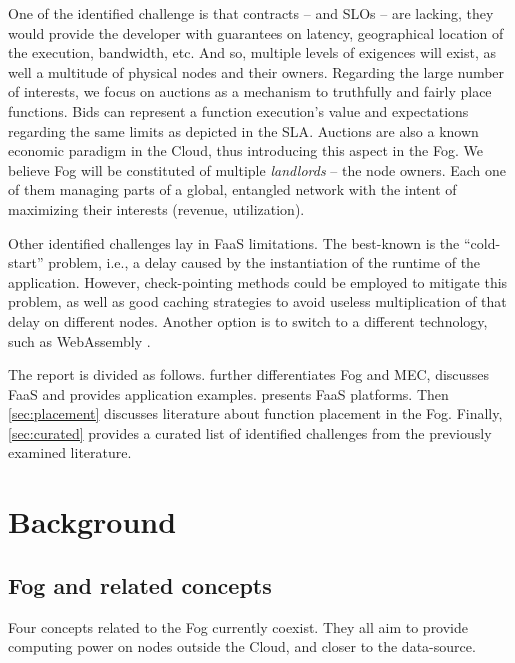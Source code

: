 One of the identified challenge is that contracts --  and \glspl{SLO} -- are lacking, they would provide the developer with guarantees on latency, geographical location of the execution, bandwidth, etc. And so, multiple levels of exigences will exist, as well a multitude of physical nodes and their owners. Regarding the large number of interests, we focus on auctions as a mechanism to truthfully and fairly place functions. Bids can represent a function execution's value and expectations regarding the same limits as depicted in the \gls{SLA}. Auctions are also a known economic paradigm in the Cloud, thus introducing this aspect in the Fog. We believe Fog will be constituted of multiple \emph{landlords} -- the node owners. Each one of them managing parts of a global, entangled network with the intent of maximizing their interests (revenue, utilization).

Other identified challenges lay in \gls{FaaS} limitations. The best-known is the ``cold-start'' problem, i.e., a delay caused by the instantiation of the runtime of the application. However, check-pointing methods could be employed to mitigate this problem, as well as good caching strategies to avoid useless multiplication of that delay on different nodes. Another option is to switch to a different technology, such as WebAssembly \cite{hykes_solomon_2019}.

The report is divided as follows.  further differentiates Fog and \gls{MEC}, discusses \gls{FaaS} and provides application examples.  presents \gls{FaaS} platforms. Then \cref{sec:placement} discusses literature about function placement in the Fog. Finally, \cref{sec:curated} provides a curated list of identified challenges from the previously examined literature.


\section{Background}
\label{sec:background}

\subsection{Fog and related concepts}

Four concepts related to the Fog currently coexist. They all aim to provide computing power on nodes outside the Cloud, and closer to the data-source.

